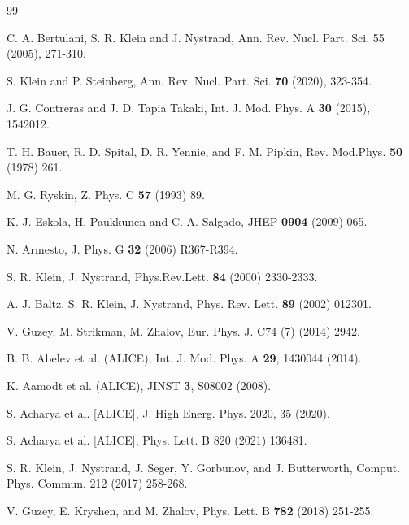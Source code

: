 \documentclass[12pt]{article}
\begin{document}
\begin{thebibliography}{99}



C. A. Bertulani, S. R. Klein and J. Nystrand, Ann. Rev. Nucl. Part. Sci. 55 (2005), 271-310.

S. Klein and P. Steinberg, Ann. Rev. Nucl. Part. Sci. {\bf 70} (2020), 323-354.

J. G. Contreras and J. D. Tapia Takaki, Int. J. Mod. Phys. A {\bf 30} (2015), 1542012.

T. H. Bauer, R. D. Spital, D. R. Yennie, and F. M. Pipkin, Rev. Mod.Phys. {\bf 50} (1978) 261.

M. G. Ryskin, Z. Phys. C {\bf 57} (1993) 89.

K. J. Eskola, H. Paukkunen and C. A. Salgado, JHEP {\bf 0904} (2009) 065.

N. Armesto, J. Phys. G {\bf 32} (2006) R367-R394.

S. R. Klein, J. Nystrand, Phys.Rev.Lett. {\bf 84} (2000) 2330-2333.

A. J. Baltz, S. R. Klein, J. Nystrand, Phys. Rev. Lett. {\bf 89} (2002) 012301.

V. Guzey, M. Strikman, M. Zhalov, Eur. Phys. J. C74 (7) (2014) 2942.

B. B. Abelev et al. (ALICE), Int. J. Mod. Phys. A {\bf 29}, 1430044 (2014).

K. Aamodt et al. (ALICE), JINST {\bf 3}, S08002 (2008).

S. Acharya et al. [ALICE], J. High Energ. Phys. 2020, 35 (2020).

S. Acharya et al. [ALICE], Phys. Lett. B 820 (2021) 136481.

S. R. Klein, J. Nystrand, J. Seger, Y. Gorbunov, and J. Butterworth, Comput. Phys. Commun. 212 (2017) 258-268.

V. Guzey, E. Kryshen, and M. Zhalov, Phys. Lett. B {\bf 782} (2018) 251-255.


\end{thebibliography}
\end{document}
